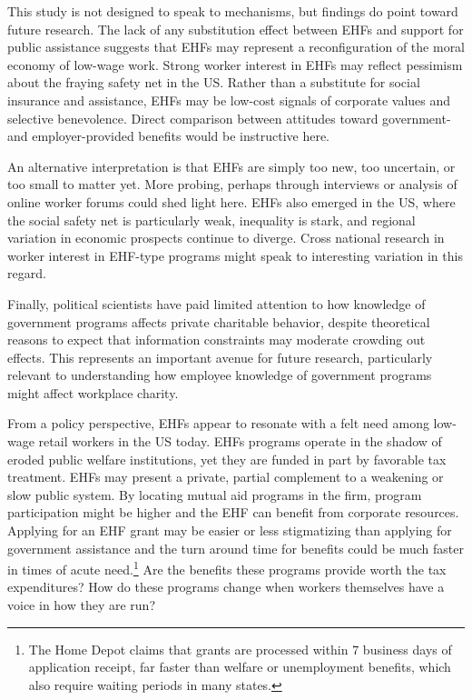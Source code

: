 \documentclass[
  11pt,
  oneside]{article}
\begin{document}
This study is not designed to speak to mechanisms, but findings do point toward future research. The lack of any substitution effect between EHFs and support for public assistance suggests that EHFs may represent a reconfiguration of the moral economy of low-wage work. Strong worker interest in EHFs may reflect pessimism about the fraying safety net in the US. Rather than a substitute for social insurance and assistance, EHFs may be low-cost signals of corporate values and selective benevolence. Direct comparison between attitudes toward government- and employer-provided benefits would be instructive here.

An alternative interpretation is that EHFs are simply too new, too uncertain, or too small to matter yet. More probing, perhaps through interviews or analysis of online worker forums could shed light here. EHFs also emerged in the US, where the social safety net is particularly weak, inequality is stark, and regional variation in economic prospects continue to diverge. Cross national research in worker interest in EHF-type programs might speak to interesting variation in this regard.

Finally, political scientists have paid limited attention to how knowledge of government programs affects private charitable behavior, despite theoretical reasons to expect that information constraints may moderate crowding out effects. This represents an important avenue for future research, particularly relevant to understanding how employee knowledge of government programs might affect workplace charity.

From a policy perspective, EHFs appear to resonate with a felt need among low-wage retail workers in the US today. EHFs programs operate in the shadow of eroded public welfare institutions, yet they are funded in part by favorable tax treatment. EHFs may present a private, partial complement to a weakening or slow public system. By locating mutual aid programs in the firm, program participation might be higher and the EHF can benefit from corporate resources. Applying for an EHF grant may be easier or less stigmatizing than applying for government assistance and the turn around time for benefits could be much faster in times of acute need.\footnote{The Home Depot claims that grants are processed within 7 business days of application receipt, far faster than welfare or unemployment benefits, which also require waiting periods in many states.} Are the benefits these programs provide worth the tax expenditures? How do these programs change when workers themselves have a voice in how they are run?
\end{document}
